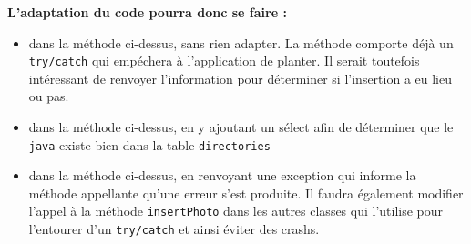 \begin{enumerate}
    \textbf{L'adaptation du code pourra donc se faire :}
    \begin{itemize}
        \item dans la méthode ci-dessus, sans rien adapter. La méthode comporte déjà un \texttt{try/catch} qui empéchera à l'application de planter. Il serait toutefois intéressant de renvoyer l'information pour déterminer si l'insertion a eu lieu ou pas.
        \item dans la méthode ci-dessus, en y ajoutant un sélect afin de déterminer que le \texttt{java} existe bien dans la table \texttt{directories}
        \item dans la méthode ci-dessus, en renvoyant une exception qui informe la méthode appellante qu'une erreur s'est produite. Il faudra également modifier l'appel à la méthode \texttt{insertPhoto} dans les autres classes qui l'utilise pour l'entourer d'un \texttt{try/catch} et ainsi éviter des crashs.
    \end{itemize}
\end{enumerate}
